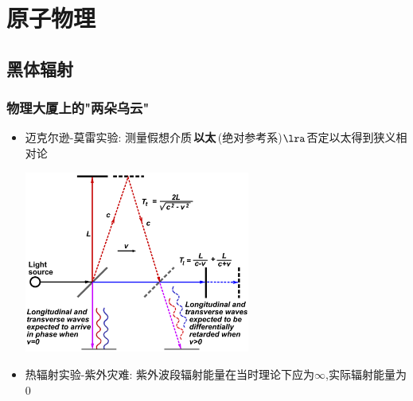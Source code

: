 \documentclass{article}
\begin{document}
\vspace{2em}

\section{原子物理}
\subsection{黑体辐射}

\subsubsection{物理大厦上的"两朵乌云"}
\begin{itemize}
    \item 迈克尔逊-莫雷实验: 测量假想介质\,\textbf{以太}\,(绝对参考系)$\lra$否定以太得到狭义相对论

          \vspace{1em}

          \includegraphics[width=20em,keepaspectratio]{./pictures/4.png}

          \vspace{1em}

    \item 热辐射实验-紫外灾难: 紫外波段辐射能量在当时理论下应为$\infty$,实际辐射能量为$0$
\end{itemize}

\vspace{2em}
\end{document}
